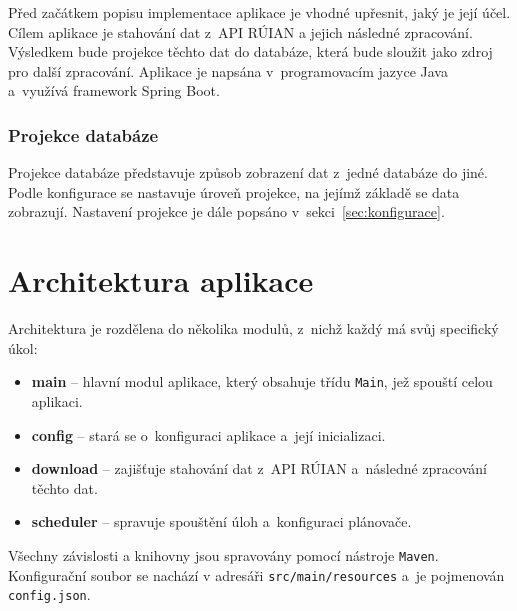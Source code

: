 Před začátkem popisu implementace aplikace je vhodné upřesnit, jaký je její účel.
Cílem aplikace je stahování dat z~API RÚIAN a jejich následné zpracování.
Výsledkem bude projekce těchto dat do databáze, která bude sloužit jako zdroj pro další zpracování.
Aplikace je napsána v~programovacím jazyce Java a~využívá framework Spring Boot.

\subsubsection*{Projekce databáze}
Projekce databáze představuje způsob zobrazení dat z~jedné databáze do jiné.
Podle konfigurace se nastavuje úroveň projekce, na jejímž základě se data zobrazují.
Nastavení projekce je dále popsáno v~sekci~\ref{sec:konfigurace}.

\section{Architektura aplikace}
Architektura je rozdělena do několika modulů, z~nichž každý má svůj specifický úkol:
\begin{itemize}[itemsep=0pt]
    \item \textbf{main} -- hlavní modul aplikace, který obsahuje třídu \texttt{Main}, jež spouští celou aplikaci.
    \item \textbf{config} -- stará se o~konfiguraci aplikace a~její inicializaci.
    \item \textbf{download} -- zajišťuje stahování dat z~API RÚIAN a~následné zpracování těchto dat.
    \item \textbf{scheduler} -- spravuje spouštění úloh a~konfiguraci plánovače.
\end{itemize}
Všechny závislosti a knihovny jsou spravovány pomocí nástroje \texttt{Maven}.
Konfigurační soubor se nachází v adresáři \texttt{src/main/resources} a~je pojmenován \texttt{config.json}.